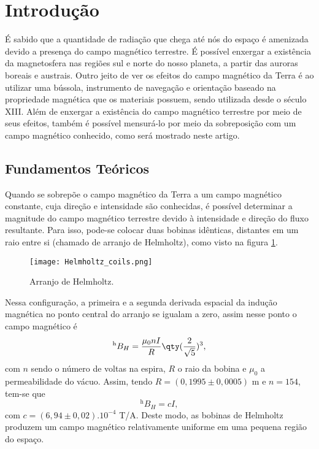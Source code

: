 \documentclass[reprint,amsmath,amssymb,aps]{revtex4-2}
\begin{document}
\section{Introdução}

É sabido que a quantidade de radiação que chega até nós do espaço é amenizada devido a presença do campo magnético terrestre. É possível enxergar a existência da magnetosfera nas regiões sul e norte do nosso planeta, a partir das auroras boreais e austrais. Outro jeito de ver os efeitos do campo magnético da Terra é ao utilizar uma bússola, instrumento de navegação e orientação baseado na propriedade magnética que os materiais possuem, sendo utilizada desde o século XIII. 
Além de enxergar a existência do campo magnético terrestre por meio de seus efeitos, também é possível mensurá-lo por meio da sobreposição com um campo magnético conhecido, como será mostrado neste artigo.

\subsection{Fundamentos Teóricos}

Quando se sobrepõe o campo magnético da Terra a um campo magnético constante, cuja direção e intensidade são conhecidas, é possível determinar a magnitude do campo magnético terrestre devido à intensidade e direção do fluxo resultante. Para isso, pode-se colocar duas bobinas idênticas, distantes em um raio entre si (chamado de arranjo de Helmholtz), como visto na figura \ref{bobinas de helmholtz}.
\begin{figure}[h]
\texttt{[image: Helmholtz\_coils.png]}
\caption{\label{bobinas de helmholtz} Arranjo de Helmholtz.}
\end{figure}

Nessa configuração, a primeira e a segunda derivada espacial da indução magnética no ponto central do arranjo se igualam a zero, assim nesse ponto o campo magnético é \cite{reitzfundamentos}
\begin{equation}
    ^\text{h}B_H =\frac{\mu_0 n I}{R} \qty(\frac{2}{\sqrt{5}})^3,
\end{equation}
com $n$ sendo o número de voltas na espira, $R$ o raio da bobina e $\mu_0$ a permeabilidade do vácuo. Assim, tendo $R=(0,1995\pm0,0005)$ m e $n=154$, tem-se que
\begin{equation}
    ^\text{h}B_H =cI,
\end{equation}
com $c=(6,94\pm0,02).10^{-4}$ T/A.
Deste modo, as bobinas de Helmholtz produzem um campo magnético relativamente uniforme em uma pequena região do espaço.
\end{document}
